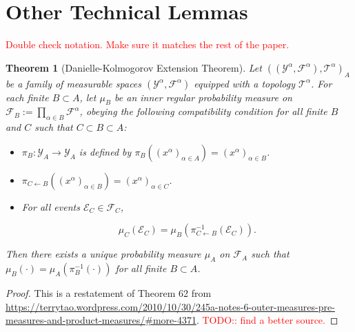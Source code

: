 \documentclass[12pt]{article}
\newcommand{\mc}{\mathcal}
\newcommand{\ra}{\rightarrow}
\newcommand{\tr}{\textcolor{red}}
\newcommand{\defeq}{:=}								%
\newcommand{\indx}[1]{^{#1}}						%
\newcommand{\Xf}{X}									%
\newcommand{\F}{\mc{F}}								%
\newcommand{\m}{\mu}								%
\newcommand{\proj}{\pi}								%
\newcommand{\xf}{x}									%
\newcommand{\spce}{\mc{Y}}							%
\newcommand{\evnt}{\mc{E}}						%
\newcommand{\topo}{\mc{T}}						%
\newcommand{\indxset}[1]{_{#1}}					%
\newtheorem{thms}{Theorem}[section]
\begin{document}
\section{Other Technical Lemmas}
\label{TL}
\tr{Double check notation. Make sure it matches the rest of the paper.}

\begin{thms}[Danielle-Kolmogorov Extension Theorem]
Let \(((\spce\indx{\alpha},\F\indx{\alpha}),\topo\indx{\alpha})\indxset{A}\) be a family of measurable spaces \((\spce\indx{\alpha},\F\indx{\alpha})\) equipped with a topology \(\topo\indx{\alpha}\). For each finite \(B \subset A\), let \(\m\indxset{B}\) be an inner regular probability measure on \(\F\indxset{B} \defeq \prod_{\alpha\in B} \F\indx{\alpha}\), obeying the following compatibility condition for all finite \(B\) and \(C\) such that \(C \subset B\subset A\):

\begin{itemize}
\item \(\proj\indxset{B}: \spce\indxset{A} \ra \spce\indxset{A}\) is defined by \(\proj\indxset{B}\left((\xf\indx{\alpha})\indxset{\alpha\in A}\right) = (\xf\indx{\alpha})\indxset{\alpha\in B}\).

\item \(\proj\indxset{C\leftarrow B}\left((\xf\indx{\alpha})\indxset{\alpha \in B}\right) = (\xf\indx{\alpha})\indxset{\alpha \in C}\).

\item For all events \(\evnt\indxset{C} \in \F\indxset{C}\),

\[\m\indxset{C}(\evnt\indxset{C}) = \m\indxset{B}\left(\proj\indxset{C\leftarrow B}^{-1}(\evnt\indxset{C})\right).\]
\end{itemize}

Then there exists a unique probability measure \(\m\indxset{A}\) on \(\F\indxset{A}\) such that \(\m\indxset{B}(\cdot) = \m\indxset{A}\left(\proj\indxset{B}^{-1}(\cdot)\right)\) for all finite \(B \subset A\).
\label{TL::DanKolExt}
\end{thms}

\begin{proof}
This is a restatement of Theorem 62 from \url{https://terrytao.wordpress.com/2010/10/30/245a-notes-6-outer-measures-pre-measures-and-product-measures/#more-4371}. \tr{TODO:: find a better source.}
\end{proof}

\newpage


\end{document}
